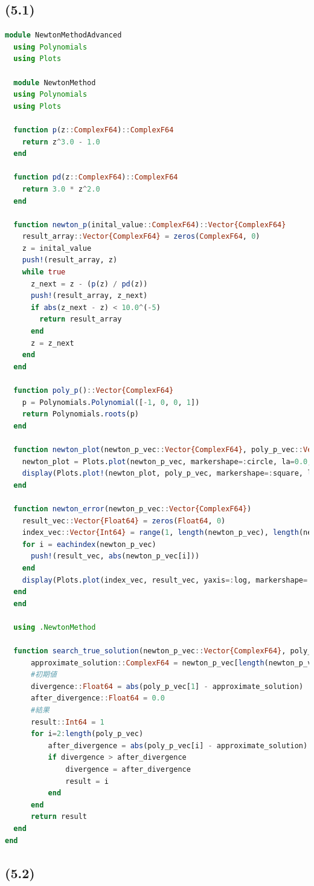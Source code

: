 \documentclass[uplatex, dvipdfmx, a4j,11pt]{jsarticle}
\begin{document}
\subsection*{(5.1)}
\begin{lstlisting}[title={(5.1)}, label=code:in, language=Julia]
module NewtonMethodAdvanced
  using Polynomials
  using Plots
  
  module NewtonMethod
  using Polynomials
  using Plots
  
  function p(z::ComplexF64)::ComplexF64
    return z^3.0 - 1.0
  end
  
  function pd(z::ComplexF64)::ComplexF64
    return 3.0 * z^2.0
  end
  
  function newton_p(inital_value::ComplexF64)::Vector{ComplexF64}
    result_array::Vector{ComplexF64} = zeros(ComplexF64, 0)
    z = inital_value
    push!(result_array, z)
    while true
      z_next = z - (p(z) / pd(z))
      push!(result_array, z_next)
      if abs(z_next - z) < 10.0^(-5)
        return result_array
      end
      z = z_next
    end
  end
  
  function poly_p()::Vector{ComplexF64}
    p = Polynomials.Polynomial([-1, 0, 0, 1])
    return Polynomials.roots(p)
  end
  
  function newton_plot(newton_p_vec::Vector{ComplexF64}, poly_p_vec::Vector{ComplexF64})
    newton_plot = Plots.plot(newton_p_vec, markershape=:circle, la=0.0, label="Newton Method")
    display(Plots.plot!(newton_plot, poly_p_vec, markershape=:square, la=0.0, label="Answer"))
  end
  
  function newton_error(newton_p_vec::Vector{ComplexF64})
    result_vec::Vector{Float64} = zeros(Float64, 0)
    index_vec::Vector{Int64} = range(1, length(newton_p_vec), length(newton_p_vec))
    for i = eachindex(newton_p_vec)
      push!(result_vec, abs(newton_p_vec[i]))
    end
    display(Plots.plot(index_vec, result_vec, yaxis=:log, markershape=:square, la=0.0, label="Error by Newton Method"))
  end
  end
  
  using .NewtonMethod
  
  function search_true_solution(newton_p_vec::Vector{ComplexF64}, poly_p_vec::Vector{ComplexF64})::Int64
      approximate_solution::ComplexF64 = newton_p_vec[length(newton_p_vec)]
      #初期値
      divergence::Float64 = abs(poly_p_vec[1] - approximate_solution)
      after_divergence::Float64 = 0.0
      #結果
      result::Int64 = 1
      for i=2:length(poly_p_vec)
          after_divergence = abs(poly_p_vec[i] - approximate_solution)
          if divergence > after_divergence
              divergence = after_divergence
              result = i
          end
      end
      return result
  end
end
\end{lstlisting}


\subsection*{(5.2)}
\textmc{

}
\end{document}
